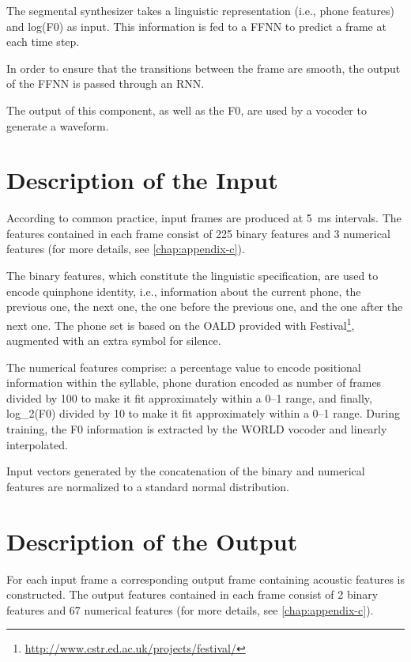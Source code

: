 The segmental synthesizer takes a linguistic representation (i.e., phone features) and log(\ac{F0}) as input.
This information is fed to a \ac{FFNN} to predict a frame at each time step.

In order to ensure that the transitions between the frame are smooth, the output of the \ac{FFNN} is passed through an \ac{RNN}.

The output of this component, as well as the \ac{F0}, are used by a vocoder to generate a waveform.




\section{Description of the Input}

According to common practice, input frames are produced at 5~ms intervals.
The features contained in each frame consist of 225 binary features and 3 numerical features (for more details, see \autoref{chap:appendix-c}).

The binary features, which constitute the linguistic specification, are used to encode quinphone identity, i.e., information about the current phone, the previous one, the next one, the one before the previous one, and the one after the next one.
The phone set is based on the \ac{OALD} provided with Festival\footnote{\url{http://www.cstr.ed.ac.uk/projects/festival/}}, augmented with an extra symbol for silence.

The numerical features comprise: a percentage value to encode positional information within the syllable, phone duration encoded as number of frames divided by 100 to make it fit approximately within a 0--1 range, and finally, log_2(\ac{F0}) divided by 10 to make it fit approximately within a 0--1 range.
During training, the \ac{F0} information is extracted by the WORLD vocoder and linearly interpolated.

Input vectors generated by the concatenation of the binary and numerical features are normalized to a standard normal distribution.


\section{Description of the Output}

For each input frame a corresponding output frame containing acoustic features is constructed.
The output features contained in each frame consist of 2 binary features and 67 numerical features (for more details, see \autoref{chap:appendix-c}).

